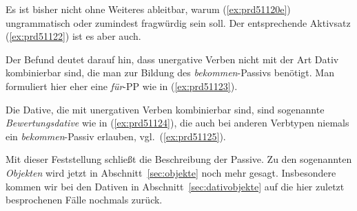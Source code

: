 \begin{exe}
  \ex\label{ex:prd51121} 
  \begin{xlist}
  \end{xlist}
\end{exe}

Es ist bisher nicht ohne Weiteres ableitbar, warum (\ref{ex:prd51120e}) ungrammatisch oder zumindest fragwürdig sein soll.
Der entsprechende Aktivsatz (\ref{ex:prd51122}) ist es aber auch.

\begin{exe}
\end{exe}


Der Befund deutet darauf hin, dass unergative Verben nicht mit der Art Dativ kombinierbar sind, die man zur Bildung des \textit{bekommen}-Passivs benötigt.
Man formuliert hier eher eine \textit{für}-PP wie in (\ref{ex:prd51123}).

\begin{exe}
\end{exe}

Die Dative, die mit unergativen Verben kombinierbar sind, sind sogenannte \textit{Bewertungsdative} wie in (\ref{ex:prd51124}), die auch bei anderen Verbtypen niemals ein \textit{bekommen}-Passiv erlauben, vgl.\ (\ref{ex:prd51125}).

\begin{exe}
  \ex\label{ex:prd51124} 
  \begin{xlist}
  \end{xlist}
  \ex\label{ex:prd51125} 
  \begin{xlist}
  \end{xlist}
\end{exe}

Mit dieser Feststellung schließt die Beschreibung der Passive.
Zu den sogenannten \textit{Objekten} wird jetzt in Abschnitt~\ref{sec:objekte} noch mehr gesagt.
Insbesondere kommen wir bei den Dativen in Abschnitt~\ref{sec:dativobjekte} auf die hier zuletzt besprochenen Fälle nochmals zurück.

